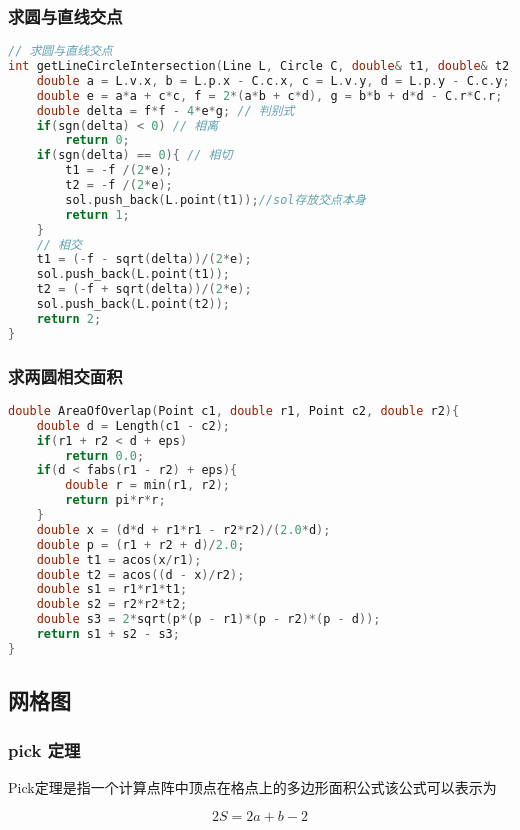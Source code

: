 \subsubsection{求圆与直线交点}

\begin{lstlisting}[language=C++]
// 求圆与直线交点
int getLineCircleIntersection(Line L, Circle C, double& t1, double& t2, vector<Point>& sol){
    double a = L.v.x, b = L.p.x - C.c.x, c = L.v.y, d = L.p.y - C.c.y;
    double e = a*a + c*c, f = 2*(a*b + c*d), g = b*b + d*d - C.r*C.r;
    double delta = f*f - 4*e*g; // 判别式
    if(sgn(delta) < 0) // 相离
        return 0;
    if(sgn(delta) == 0){ // 相切
        t1 = -f /(2*e);
        t2 = -f /(2*e);
        sol.push_back(L.point(t1));//sol存放交点本身
        return 1;
    }
    // 相交
    t1 = (-f - sqrt(delta))/(2*e);
    sol.push_back(L.point(t1));
    t2 = (-f + sqrt(delta))/(2*e);
    sol.push_back(L.point(t2));
    return 2;
}
\end{lstlisting}

\subsubsection{求两圆相交面积}

\begin{lstlisting}[language=C++]
double AreaOfOverlap(Point c1, double r1, Point c2, double r2){
    double d = Length(c1 - c2);
    if(r1 + r2 < d + eps)
        return 0.0;
    if(d < fabs(r1 - r2) + eps){
        double r = min(r1, r2);
        return pi*r*r;
    }
    double x = (d*d + r1*r1 - r2*r2)/(2.0*d);
    double p = (r1 + r2 + d)/2.0;
    double t1 = acos(x/r1);
    double t2 = acos((d - x)/r2);
    double s1 = r1*r1*t1;
    double s2 = r2*r2*t2;
    double s3 = 2*sqrt(p*(p - r1)*(p - r2)*(p - d));
    return s1 + s2 - s3;
}
\end{lstlisting}

\subsection{网格图}

\subsubsection{pick 定理}

Pick定理是指一个计算点阵中顶点在格点上的多边形面积公式该公式可以表示为

$$2S = 2a + b − 2$$

